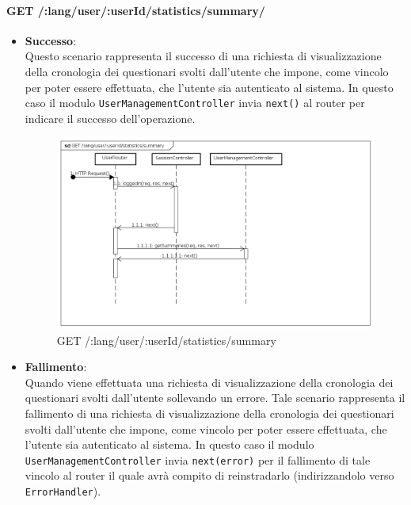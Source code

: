 \paragraph{GET /:lang/user/:userId/statistics/summary/}
\begin{itemize}
\item \textbf{Successo}:
\\
Questo scenario rappresenta il successo di una richiesta di visualizzazione della cronologia dei questionari svolti dall'utente che impone, come vincolo per poter essere effettuata, che l'utente sia autenticato al sistema.  
In questo caso il modulo \texttt{UserManagementController} invia \texttt{next()} al router per indicare il successo dell'operazione.
\label{Procedura di visualizzazione della cronologia dei questionari svolti}
\begin{figure}[ht]
	\centering
	\includegraphics[scale=0.40]{UML/DiagrammiDiSequenza/Back-end/GET_LangUserUserIdStatisticsSummarySuccess.png}
	\caption{GET /:lang/user/:userId/statistics/summary}
\end{figure}
\FloatBarrier
\item \textbf{Fallimento}:
\\
Quando viene effettuata una richiesta di visualizzazione della cronologia dei questionari svolti dall'utente sollevando un errore. Tale scenario rappresenta il fallimento di una richiesta di visualizzazione della cronologia dei questionari svolti dall'utente che impone, come vincolo per poter essere effettuata, che l'utente sia autenticato al sistema. In questo caso il modulo \texttt{UserManagementController} invia \texttt{next(error)} per il fallimento di tale vincolo al router il quale avrà compito di reinstradarlo (indirizzandolo verso \texttt{ErrorHandler}).
\label{Fallimento della procedura di visualizzazione della cronologia dei questionari svolti}

\end{itemize}

